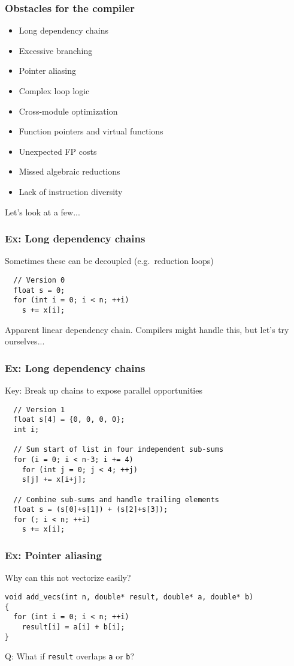 \documentclass{beamer}
\begin{document}
\begin{frame}
  \frametitle{Obstacles for the compiler}

  \begin{itemize}
  \item Long dependency chains
  \item Excessive branching
  \item Pointer aliasing
  \item Complex loop logic
  \item Cross-module optimization
  \item Function pointers and virtual functions
  \item Unexpected FP costs
  \item Missed algebraic reductions
  \item Lack of instruction diversity
  \end{itemize}
  Let's look at a few...
\end{frame}


\begin{frame}[fragile]
  \frametitle{Ex: Long dependency chains}

  Sometimes these can be decoupled (e.g.~reduction loops)
  \begin{lstlisting}
  // Version 0
  float s = 0;
  for (int i = 0; i < n; ++i)
    s += x[i];
  \end{lstlisting}
  Apparent linear dependency chain.  Compilers might handle this, but
  let's try ourselves...
\end{frame}


\begin{frame}[fragile]
  \frametitle{Ex: Long dependency chains}

  Key: Break up chains to expose parallel opportunities
  \begin{lstlisting}
  // Version 1
  float s[4] = {0, 0, 0, 0};
  int i;

  // Sum start of list in four independent sub-sums
  for (i = 0; i < n-3; i += 4)
    for (int j = 0; j < 4; ++j)
    s[j] += x[i+j];

  // Combine sub-sums and handle trailing elements
  float s = (s[0]+s[1]) + (s[2]+s[3]);
  for (; i < n; ++i)
    s += x[i];
\end{lstlisting}  
\end{frame}


\begin{frame}[fragile]
  \frametitle{Ex: Pointer aliasing}

Why can this not vectorize easily?
\begin{lstlisting}
void add_vecs(int n, double* result, double* a, double* b)
{
  for (int i = 0; i < n; ++i)
    result[i] = a[i] + b[i];
}
\end{lstlisting}
Q: What if {\tt result} overlaps {\tt a} or {\tt b}?
\end{frame}
\end{document}
